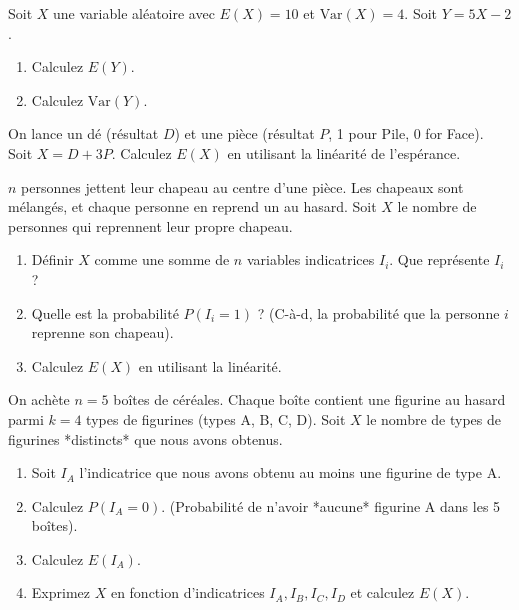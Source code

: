 \begin{exercicebox}
Soit $X$ une variable aléatoire avec $E(X)=10$ et $\text{Var}(X)=4$. Soit $Y = 5X - 2$.
\begin{enumerate}
    \item Calculez $E(Y)$.
    \item Calculez $\text{Var}(Y)$.
\end{enumerate}
\end{exercicebox}


\begin{exercicebox}
On lance un dé (résultat $D$) et une pièce (résultat $P$, 1 pour Pile, 0 for Face).
Soit $X = D + 3P$.
Calculez $E(X)$ en utilisant la linéarité de l'espérance.
\end{exercicebox}

\begin{exercicebox}
$n$ personnes jettent leur chapeau au centre d'une pièce. Les chapeaux sont mélangés, et chaque personne en reprend un au hasard. Soit $X$ le nombre de personnes qui reprennent leur propre chapeau.
\begin{enumerate}
    \item Définir $X$ comme une somme de $n$ variables indicatrices $I_i$. Que représente $I_i$ ?
    \item Quelle est la probabilité $P(I_i=1)$ ? (C-à-d, la probabilité que la personne $i$ reprenne son chapeau).
    \item Calculez $E(X)$ en utilisant la linéarité.
\end{enumerate}
\end{exercicebox}

\begin{exercicebox}
On achète $n=5$ boîtes de céréales. Chaque boîte contient une figurine au hasard parmi $k=4$ types de figurines (types A, B, C, D). Soit $X$ le nombre de types de figurines *distincts* que nous avons obtenus.
\begin{enumerate}
    \item Soit $I_A$ l'indicatrice que nous avons obtenu au moins une figurine de type A.
    \item Calculez $P(I_A=0)$. (Probabilité de n'avoir *aucune* figurine A dans les 5 boîtes).
    \item Calculez $E(I_A)$.
    \item Exprimez $X$ en fonction d'indicatrices $I_A, I_B, I_C, I_D$ et calculez $E(X)$.
\end{enumerate}
\end{exercicebox}

